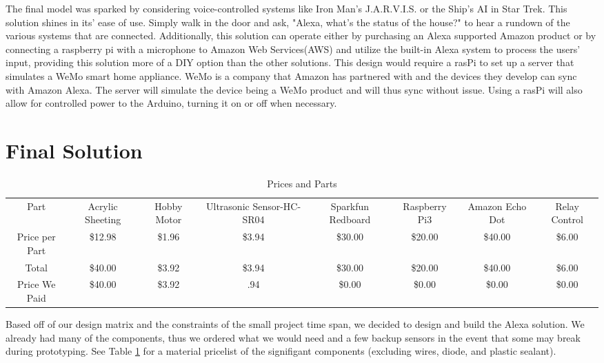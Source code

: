 \documentclass[notitlepage,11pt]{article}
\begin{document}
        The final model was sparked by considering voice-controlled systems like Iron Man's J.A.R.V.I.S. or the Ship's 
        AI in Star Trek. This solution shines in its' ease of use. Simply walk in the door and ask, "Alexa, what's the 
        status of the house?" to hear a rundown of the various systems that are connected. Additionally, this solution 
        can operate either by purchasing an Alexa supported Amazon product or by connecting a raspberry pi with a 
        microphone to Amazon Web Services(AWS) and utilize the built-in Alexa system to process the users' input, 
        providing this solution more of a DIY option than the other solutions. This design would require a rasPi to set 
        up a server that simulates a WeMo smart home appliance. WeMo is a company that Amazon has partnered with and the 
        devices they develop can sync with Amazon Alexa. The server will simulate the device being a WeMo product and 
        will thus sync without issue. Using a rasPi will also allow for controlled power to the Arduino, turning it on 
        or off when necessary. 

    \section{Final Solution}
 
    \begin{table}[!htb]
            \tiny
            \begin{tabular}{|c|c|c|c|c|c|c|c|}\hline
                Part & Acrylic Sheeting & Hobby Motor & Ultrasonic Sensor-HC-SR04 & Sparkfun Redboard & Raspberry Pi3 & Amazon Echo Dot & Relay Control\\
                Price per Part & \$12.98 & \$1.96 & \$3.94 & \$30.00 & \$20.00 & \$40.00 & \$6.00 \\
                Total &          \$40.00 & \$3.92 & \$3.94 & \$30.00 & \$20.00 & \$40.00 & \$6.00 \\
                Price We Paid  & \$40.00 & \$3.92 & \3.94  & \$0.00  & \$0.00  & \$0.00 & \$0.00 \\
                \hline
            \end{tabular}
            \label{tab:price}
            \caption{Prices and Parts}
        \end{table}

        Based off of our design matrix and the constraints of the small project time span, we decided to design and build
        the Alexa solution. We already had many of the components, thus we ordered what we would need and a few backup sensors
        in the event that some may break during prototyping. See Table \ref{tab:price} for a material pricelist of the 
        signifigant components (excluding wires, diode, and plastic sealant).
\end{document}
